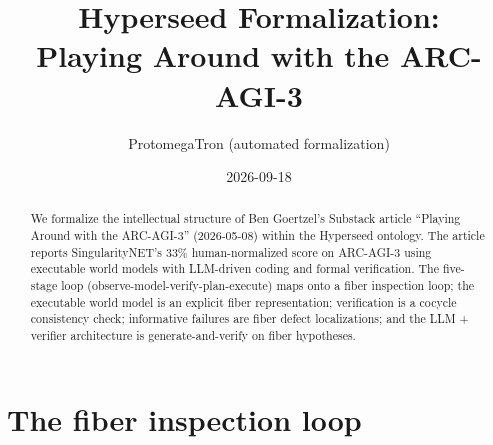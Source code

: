 \documentclass[11pt,a4paper]{article}
\title{Hyperseed Formalization:\\
  Playing Around with the ARC-AGI-3}
\author{ProtomegaTron (automated formalization)}
\date{2026-09-18}
\begin{document}
\maketitle

\begin{abstract}
We formalize the intellectual structure of Ben Goertzel's Substack article
``Playing Around with the ARC-AGI-3'' (2026-05-08) within the Hyperseed
ontology. The article reports SingularityNET's 33\% human-normalized score
on ARC-AGI-3 using executable world models with LLM-driven coding and
formal verification. The five-stage loop (observe-model-verify-plan-execute)
maps onto a fiber inspection loop; the executable world model is an explicit
fiber representation; verification is a cocycle consistency check;
informative failures are fiber defect localizations; and the LLM + verifier
architecture is generate-and-verify on fiber hypotheses.
\end{abstract}

\tableofcontents

\section{The fiber inspection loop}
\label{sec:loop}
\end{document}
